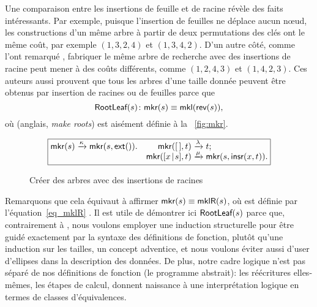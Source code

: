 Une comparaison entre les insertions de feuille et de racine révèle
des faits intéressants. Par exemple, puisque l'insertion de feuilles
ne déplace aucun n{\oe}ud, les constructions d'un même arbre à partir
de deux permutations des clés ont le même coût, par exemple
\((1,3,2,4)\) et \((1,3,4,2)\). D'un autre côté, comme l'ont remarqué
\cite{GeldenhuysVanderMerwe_2009}, fabriquer le même arbre de
recherche avec des insertions de racine peut mener à des coûts
différents, comme \((1,2,4,3)\) et \((1,4,2,3)\). Ces auteurs aussi
prouvent que tous les arbres d'une taille donnée peuvent être obtenus
par insertion de racines ou de feuilles parce que
\begin{equation}
\pred{RootLeaf}{s} \colon \fun{mkr}(s) \equiv \fun{mkl}(\fun{rev}(s)),
\label{thm_RootLeaf}
\index{RootLeaf@\predName{RootLeaf}}
\end{equation}
où  
(anglais, \emph{make roots}) est aisément définie à la
\fig~\vref{fig:mkr}.
\begin{figure}
\begin{equation*}
\boxed{
\begin{array}{@{}r@{\;}l@{\;}lr@{\;}l@{\;}l@{}}
\fun{mkr}(s) & \xrightarrow{\smash{\kappa}} &
\fun{mkr}(s,\fun{ext}()).
& \fun{mkr}(\el,t) & \xrightarrow{\smash{\lambda}} & t;\\
&&&\fun{mkr}(\cons{x}{s},t) & \xrightarrow{\smash{\mu}} & \fun{mkr}(s,\fun{insr}(x,t)).
\end{array}}
\end{equation*}
\caption{Créer des arbres avec des insertions de racines
\label{fig:mkr}}
\end{figure}
Remarquons que cela équivaut à affirmer \(\textsf{mkr}(s) \equiv
\textsf{mklR}(s)\), où  est définie par
l'équation~\eqref{eq_mklR} . Il est utile de
démontrer ici \(\textsf{RootLeaf}({s})\) parce que, contrairement à
\cite{GeldenhuysVanderMerwe_2009}, nous voulons employer une induction
structurelle pour être guidé exactement par la syntaxe des définitions
de fonction, plutôt qu'une induction sur les tailles, un concept
adventice, et nous voulons éviter aussi d'user d'ellipses dans la
description des données. De plus, notre cadre logique n'est pas séparé
de nos définitions de fonction (le programme abstrait): les
réécritures elles-mêmes, les étapes de calcul, donnent naissance à
une interprétation logique en termes de classes d'équivalences.

